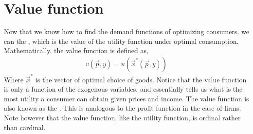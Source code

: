 \section{Value function}
Now that we know how to find the demand functions of optimizing consumers, we can the , which is the value of the utility function under optimal consumption. Mathematically, the value function is defined as,
\begin{align*}
    v(\vec{p}, y) = u(\vec{x}^*(\vec{p}, y))
\end{align*}
Where $\vec{x}^*$ is the vector of optimal choice of goods. Notice that the value function is only a function of the exogenous variables, and essentially tells us what is the most utility a consumer can obtain given prices and income. The value function is also known as the . This is analogous to the profit function in the case of firms. Note however that the value function, like the utility function, is ordinal rather than cardinal. 

